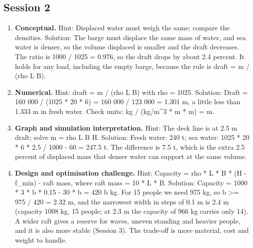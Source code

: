 \documentclass[11pt,a4paper]{article}
\begin{document}
\subsection*{Session 2}
\begin{enumerate}[nosep]
\item \textbf{Conceptual.} Hint: Displaced water must weigh the same; compare the densities. Solution: The barge must displace the same mass of water, and sea water is denser, so the volume displaced is smaller and the draft decreases. The ratio is 1000 / 1025 = 0.976, so the draft drops by about 2.4 percent. It holds for any load, including the empty barge, because the rule is draft = m / (rho L B).
\item \textbf{Numerical.} Hint: draft = m / (rho L B) with rho = 1025. Solution: Draft = 160 000 / (1025 * 20 * 6) = 160 000 / 123 000 = 1.301 m, a little less than 1.333 m in fresh water. Check units: kg / (kg/m\textasciicircum{}3 * m * m) = m.
\item \textbf{Graph and simulation interpretation.} Hint: The deck line is at 2.5 m draft; solve m = rho L B H. Solution: Fresh water: 240 t; sea water: 1025 * 20 * 6 * 2.5 / 1000 - 60 = 247.5 t. The difference is 7.5 t, which is the extra 2.5 percent of displaced mass that denser water can support at the same volume.
\item \textbf{Design and optimisation challenge.} Hint: Capacity = rho * L * B * (H - f\_min) - raft mass, where raft mass = 10 * L * B. Solution: Capacity = 1000 * 3 * b * 0.15 - 30 * b = 420 b kg. For 15 people we need 975 kg, so b \textgreater{}= 975 / 420 = 2.32 m, and the narrowest width in steps of 0.1 m is 2.4 m (capacity 1008 kg, 15 people; at 2.3 m the capacity of 966 kg carries only 14). A wider raft gives a reserve for waves, uneven standing and heavier people, and it is also more stable (Session 3). The trade-off is more material, cost and weight to handle.
\end{enumerate}
\end{document}
